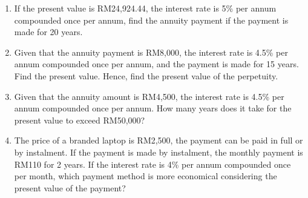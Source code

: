 \documentclass[12pt]{report}
\begin{document}
\begin{multicols}{2}
\begin{enumerate}
        \item If the present value is RM24,924.44, the interest rate is 5\% per annum
              compounded once per annum, find the annuity payment if the payment is made for
              20 years.

        \item Given that the annuity payment is RM8,000, the interest rate is 4.5\% per annum
              compounded once per annum, and the payment is made for 15 years. Find the
              present value. Hence, find the present value of the perpetuity.

        \item Given that the annuity amount is RM4,500, the interest rate is 4.5\% per annum
              compounded once per annum. How many years does it take for the present value to
              exceed RM50,000?

        \item The price of a branded laptop is RM2,500, the payment can be paid in full or by
              instalment. If the payment is made by instalment, the monthly payment is RM110
              for 2 years. If the interest rate is 4\% per annum compounded once per month,
              which payment method is more economical considering the present value of the
              payment?
    \end{enumerate}
\end{multicols}
\end{document}
